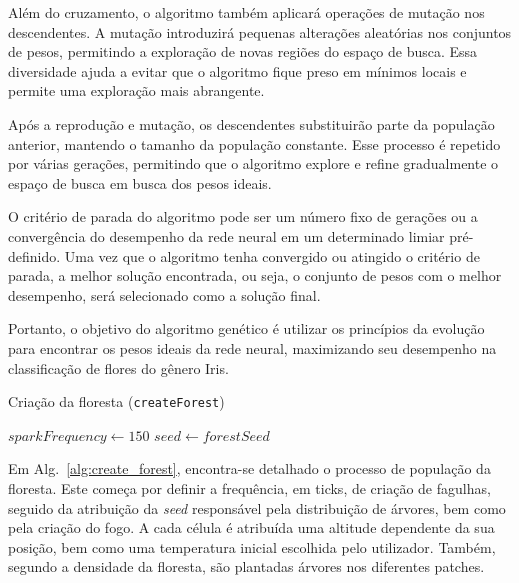 Além do cruzamento, o algoritmo também aplicará operações de mutação nos descendentes. A mutação introduzirá pequenas alterações aleatórias nos conjuntos de pesos, permitindo a exploração de novas regiões do espaço de busca. Essa diversidade ajuda a evitar que o algoritmo fique preso em mínimos locais e permite uma exploração mais abrangente.

Após a reprodução e mutação, os descendentes substituirão parte da população anterior, mantendo o tamanho da população constante. Esse processo é repetido por várias gerações, permitindo que o algoritmo explore e refine gradualmente o espaço de busca em busca dos pesos ideais.

O critério de parada do algoritmo pode ser um número fixo de gerações ou a convergência do desempenho da rede neural em um determinado limiar pré-definido. Uma vez que o algoritmo tenha convergido ou atingido o critério de parada, a melhor solução encontrada, ou seja, o conjunto de pesos com o melhor desempenho, será selecionado como a solução final.

Portanto, o objetivo do algoritmo genético é utilizar os princípios da evolução para encontrar os pesos ideais da rede neural, maximizando seu desempenho na classificação de flores do gênero Iris.


\begin{algorithm}
    \caption{Criação da floresta (\texttt{createForest})}\label{alg:create_forest}
    $sparkFrequency \gets 150$\;
    $seed \gets forestSeed$\;
\end{algorithm}

Em Alg.~\ref{alg:create_forest}, encontra-se detalhado o processo de população da floresta.
Este começa por definir a frequência, em ticks, de criação de fagulhas, seguido da atribuição da \textit{seed} responsável pela distribuição de árvores, bem como pela criação do fogo.
A cada célula é atribuída uma altitude dependente da sua posição, bem como uma temperatura inicial escolhida pelo utilizador.
Também, segundo a densidade da floresta, são plantadas árvores nos diferentes patches.


